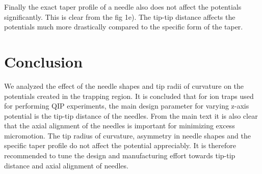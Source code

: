 \documentclass[12pt]{article}
\begin{document}
Finally the exact taper profile of a needle also does not affect the potentials significantly. 
This is clear from the fig 1e).
The tip-tip distance affects the potentials much more drastically compared to the specific form of the taper.

\section{Conclusion}
We analyzed the effect of the needle shapes and tip radii of curvature on the potentials created in the trapping region.
It is concluded that for ion traps used for performing QIP experiments, the main design parameter for varying z-axis potential is the tip-tip distance of the needles.
From the main text it is also clear that the axial alignment of the needles is important for minimizing excess micromotion.
The tip radius of curvature, asymmetry in needle shapes and the specific taper profile do not affect the potential appreciably.
It is therefore recommended to tune the design and manufacturing effort towards tip-tip distance and axial alignment of needles. 
\end{document}
